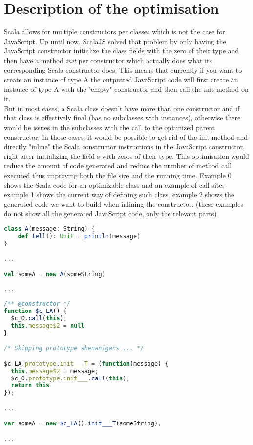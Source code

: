 \section{Description of the optimisation}
Scala allows for multiple constructors per classes which is not the case for JavaScript.
Up until now, ScalaJS solved that problem by only having the JavaScript constructor initialize the class fields with the zero of their type and then have a method \emph{init} per constructor which actually does what its corresponding Scala constructor does. This means that currently if you want to create an instance of type A the outputted JavaScript code will first create an instance of type A with the "empty" constructor and then call the init method on it. \\
But in most cases, a Scala class doesn't have more than one constructor and if that class is effectively final (has no subclasses with instances), otherwise there would be issues in the subclasses with the call to the optimized parent constructor. In those cases, it would be possible to get rid of the init method and directly "inline" the Scala constructor instructions in the JavaScript constructor, right after initializing the field s with zeros of their type. This optimisation would reduce the amount of code generated and reduce the number of method call executed thus improving both the file size and the running time. Example 0 shows the Scala code for an optimizable class and an example of call site; example 1 shows the current way of defining such class; example 2 shows the generated code we want to build when inlining the constructor. (these examples do not show all the generated JavaScript code, only the relevant parts)
\begin{lstlisting}[language=scala,caption=Example Scala Code.]
class A(message: String) {
    def tell(): Unit = println(message)
}

...

val someA = new A(someString)

...

\end{lstlisting}
\begin{lstlisting}[language=javascript,caption=Generated JavaScript without optimisation.]
/** @constructor */
function $c_LA() {
  $c_O.call(this);
  this.message$2 = null
}

/* Skipping prototype shenanigans ... */

$c_LA.prototype.init___T = (function(message) {
  this.message$2 = message;
  $c_O.prototype.init___.call(this);
  return this
});

...

var someA = new $c_LA().init___T(someString);

...

\end{lstlisting}

